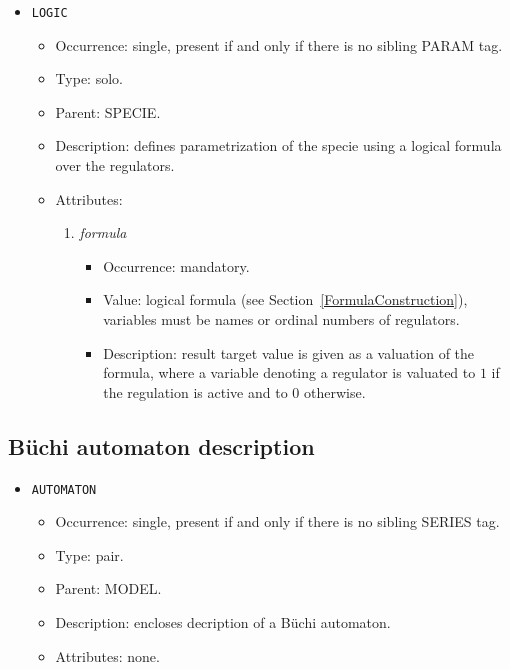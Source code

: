 \documentclass[12pt]{article}
\newenvironment{menum}{
\begin{enumerate}
  \setlength{\itemsep}{0pt}
  \setlength{\parskip}{0pt}
  \setlength{\parsep}{0pt}
}{\end{enumerate}}
\newenvironment{mitem}{
\begin{itemize}
  \setlength{\itemsep}{0pt}
  \setlength{\parskip}{0pt}
  \setlength{\parsep}{0pt}
}{\end{itemize}}
\begin{document}
\begin{mitem}
	\item \texttt{LOGIC}
	\begin{mitem}
		\item Occurrence: single, present if and only if there is no sibling PARAM tag.
		\item Type: solo.
		\item Parent: SPECIE.
		\item Description: defines parametrization of the specie using a logical formula over the regulators.
		\item Attributes:	
		\begin{menum}
			\item \textit{formula} 
			\begin{mitem}
				\item Occurrence: mandatory.
				\item Value: logical formula (see Section~\ref{FormulaConstruction}), variables must be names or ordinal numbers of regulators.
				\item Description: result target value is given as a valuation of the formula, where a variable denoting a regulator is valuated to $1$ if the regulation is active and to $0$ otherwise.
			\end{mitem}
		\end{menum}
	\end{mitem}
\end{mitem}

\subsection{B\"uchi automaton description}		
\begin{mitem}
	\item \texttt{AUTOMATON}
	\begin{mitem}
		\item Occurrence: single, present if and only if there is no sibling SERIES tag.
		\item Type: pair.
		\item Parent: MODEL.
		\item Description: encloses decription of a B\"uchi automaton.
		\item Attributes: none.
	\end{mitem}
\end{mitem}		
\end{document}
